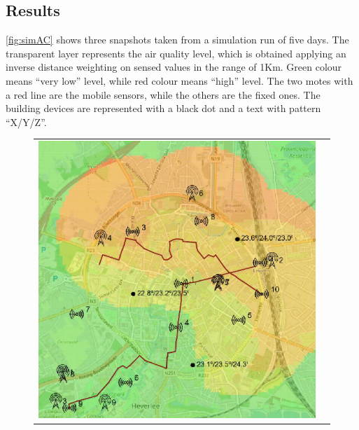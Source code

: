 \subsection{Results}
\autoref{fig:simAC} shows three snapshots taken from a simulation run of five days.
The transparent layer represents the air quality level, which is obtained applying an inverse distance weighting on sensed values in the range of 1Km. 
Green colour means ``very low'' level, while red colour means ``high'' level.
The two motes with a red line are the mobile sensors, while the others are the fixed ones.
The building devices are represented with a black dot and a text with pattern ``X/Y/Z''.
% 
\begin{figure}[h]
    \centering
    \begin{tabular}{ll}
         \includegraphics[scale=0.42]{figures/simACsnap1s.png}  &

\end{tabular}
\end{figure}
